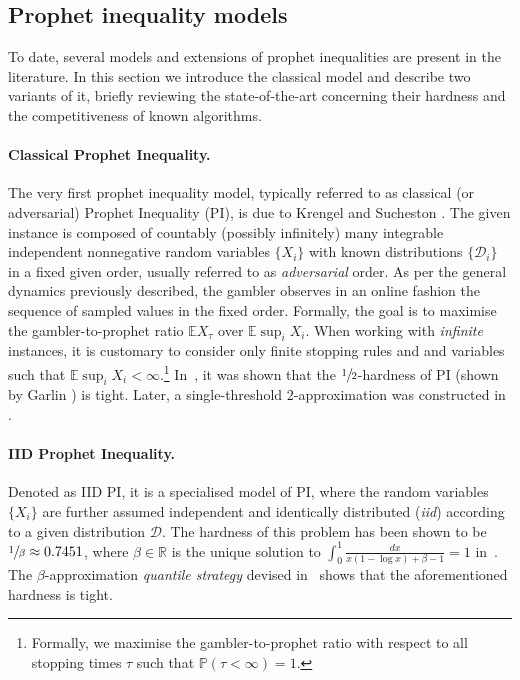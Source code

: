 \documentclass[11pt, a4paper, twoside]{article}
\newcommand{\EE}{\mathbb{E}}
\newcommand{\PP}{\mathbb{P}}
\newcommand{\DD}{\mathcal{D}}
\numberwithin{equation}{section}
\begin{document}
	\subsection{Prophet inequality models}\label{model}
	To date, several models and extensions of prophet inequalities are present in the literature. In this section we introduce the classical model and describe two variants of it, briefly reviewing the state-of-the-art concerning their hardness and the competitiveness of known algorithms.
	
	\paragraph{Classical Prophet Inequality.}
	The very first prophet inequality model, typically referred to as classical (or adversarial) Prophet Inequality (PI), is due to Krengel and Sucheston \cite{KrenSuch77,KrenSuch78}. The given instance is composed of  countably (possibly infinitely) many integrable independent nonnegative random variables $\{X_i\}$ with known distributions $\{\mathcal{D}_i\}$ in a fixed given order, usually referred to as \emph{adversarial} order. As per the general dynamics previously described, the gambler observes in an online fashion the sequence of sampled values in the fixed order. Formally, the goal is to maximise the gambler-to-prophet ratio $\EE X_\tau$ over $\EE\sup_iX_i$. When working with \textit{infinite} instances, it is customary to consider only finite stopping rules and and variables such that $\EE\sup_iX_i<\infty$.\footnote{Formally, we maximise the gambler-to-prophet ratio with respect to all stopping times $\tau$ such that $\PP(\tau<\infty)=1$.} In~\cite{KrenSuch78}, it was shown that the $\sfrac{1}{2}$-hardness of PI (shown by Garlin \cite{KrenSuch77}) is tight. Later, a single-threshold $2$-approximation was constructed in \cite{Sam84}.
	
	\paragraph{IID Prophet Inequality.}
	Denoted as IID PI, it is a specialised model of PI, where the random variables $\{X_i\}$ are further assumed independent and identically distributed (\textit{iid}) according to a given distribution $\DD$. The hardness of this problem has been shown to be $\sfrac{1}{\beta}\approx 0.7451$, where $\beta\in\mathbb{R}$ is the unique solution to $\int_0^1 \frac{dx}{x(1-\log x)+\beta-1} = 1$ in~\cite{Kertz86}. The $\beta$-approximation \textit{quantile strategy} devised in~\cite{Correa17} shows that the aforementioned hardness is tight. 
\end{document}

